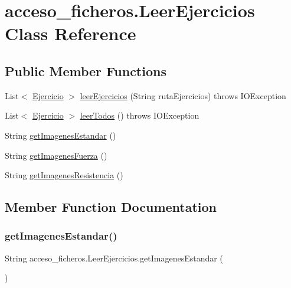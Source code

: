\hypertarget{classacceso__ficheros_1_1_leer_ejercicios}{}\section{acceso\+\_\+ficheros.\+Leer\+Ejercicios Class Reference}
\label{classacceso__ficheros_1_1_leer_ejercicios}
\subsection*{Public Member Functions}
\begin{DoxyCompactItemize}
\item 
List$<$ \mbox{\hyperlink{classclases_1_1_ejercicio}{Ejercicio}} $>$ \mbox{\hyperlink{classacceso__ficheros_1_1_leer_ejercicios_a807ed26b56826ddb590bb843b51b400b}{leer\+Ejercicios}} (String ruta\+Ejercicios)  throws I\+O\+Exception
\item 
List$<$ \mbox{\hyperlink{classclases_1_1_ejercicio}{Ejercicio}} $>$ \mbox{\hyperlink{classacceso__ficheros_1_1_leer_ejercicios_ad4aa9d50306dbddf23ec64d6d483c829}{leer\+Todos}} ()  throws I\+O\+Exception
\item 
String \mbox{\hyperlink{classacceso__ficheros_1_1_leer_ejercicios_a3f86d1ca3362fba0f4f8b272cb4f82d2}{get\+Imagenes\+Estandar}} ()
\item 
String \mbox{\hyperlink{classacceso__ficheros_1_1_leer_ejercicios_a0d095d45f45adb79a563c99427b29f97}{get\+Imagenes\+Fuerza}} ()
\item 
String \mbox{\hyperlink{classacceso__ficheros_1_1_leer_ejercicios_a76b1398f6aa46ed2deb56c6e8b6b27bc}{get\+Imagenes\+Resistencia}} ()
\end{DoxyCompactItemize}


\subsection{Member Function Documentation}
\mbox{\label{classacceso__ficheros_1_1_leer_ejercicios_a3f86d1ca3362fba0f4f8b272cb4f82d2}} 
\subsubsection{\texorpdfstring{get\+Imagenes\+Estandar()}{getImagenesEstandar()}}
{\footnotesize\ttfamily String acceso\+\_\+ficheros.\+Leer\+Ejercicios.\+get\+Imagenes\+Estandar (\begin{DoxyParamCaption}{ }\end{DoxyParamCaption})}

